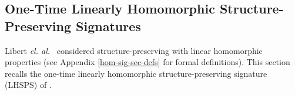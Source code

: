 \documentclass[10pt]{llncs}
\newcommand{\G}{\mathbb{G}}
\newcommand{\Z}{\mathbb{Z}}
\newcommand{\sk}{\mathsf{sk}}
\newcommand{\pk}{\mathsf{pk}}
\newcommand{\sample}{\stackrel{{\scriptscriptstyle \mkern4mu R}}{\gets}}
\newcommand{\etal}{\textit{el. al.}}
\begin{document}
	
\subsection{One-Time Linearly Homomorphic Structure-Preserving Signatures}
\label{H-SPS}  
 
Libert \etal\  \cite{DBLP:conf/crypto/LibertPJY13} considered structure-preserving with
linear homomorphic properties (see Appendix \ref{hom-sig-sec-defs} for formal definitions). This section recalls the one-time
 linearly  homomorphic structure-preserving signature (LHSPS) of \cite{DBLP:conf/crypto/LibertPJY13}.
  
	\begin{comment}
	
\begin{description}
\item[\boldmath$\mathsf{Keygen}(\lambda,n)$:] Given a security
  parameter $\lambda$ and the dimension $n \in \mathbb{N}$ of the
  subspace to be signed, choose bilinear group $(\G,\hat{\G},\G_T)$ of
  prime order $p$. %
  Then, choose $\hat{g_z},\hat{g_r},\hat{h_z},\hat{h_u} \sample
  \hat{\G}$.  For $i=1$ to $n$, pick $\chi_i,\gamma_i,\delta_i \sample
  \Z_p$ and compute $\hat{g}_i=\hat{g_z}^{\chi_i}
  \hat{g_r}^{\gamma_i}$, $\hat{h}_i=\hat{h_z}^{\chi_i}
  \hat{h_u}^{\delta_i}$.  The private key is defined to be $\sk = \{ (\chi_i,
  \gamma_i,\delta_i ) \}_{i=1}^n $ while the public key is $ \pk=\big(
  \hat{g_z},~\hat{g_r},~\hat{h_z},~ \hat{h_u},~\{ (\hat{g}_i,\hat{h}_i
  ) \}_{i=1}^n \big) \in \hat{\G}^{2n+4}$.
 
\item[\boldmath$\mathsf{Sign}(\sk, (M_1,\dotsc,M_n))$:] To sign a
  vector $(M_1,\dotsc,M_n) \in \G^n$ using $\sk= \{ (\chi_i,
  \gamma_i,\delta_i ) \}_{i=1}^n $, output $\sigma=(z,r,u ) \in \G^3
  $, where $z = \prod_{i=1}^n M_i^{\chi_i} $, $r = \prod_{i=1}^n,
  M_i^{\gamma_i} $ and $ u = \prod_{i=1}^n M_i^{\delta_i}
  $.

\item[\boldmath$\mathsf{SignDerive}(\pk, \{(\omega_i,
  \sigma^{(i)})\}_{i=1}^\ell)$:] Given   $\pk$ as well as
  $\ell$ tuples $(\omega_i,\sigma^{(i)}) $, parse $\sigma^{(i)}$ as
  $\sigma^{(i)}=\big( z_i,r_i,u_i \big)  $ for $i=1$ to
  $\ell$.  Compute and return $\sigma=(z,r,u )$, where $z =
  \prod_{i=1}^\ell z_{i}^{\omega_i}$, $r=\prod_{i=1}^{\ell}
  r_i^{\omega_i}$, $u=\prod_{i=1}^{\ell} u_i^{\omega_i} $.


\end{comment}
\end{document}
